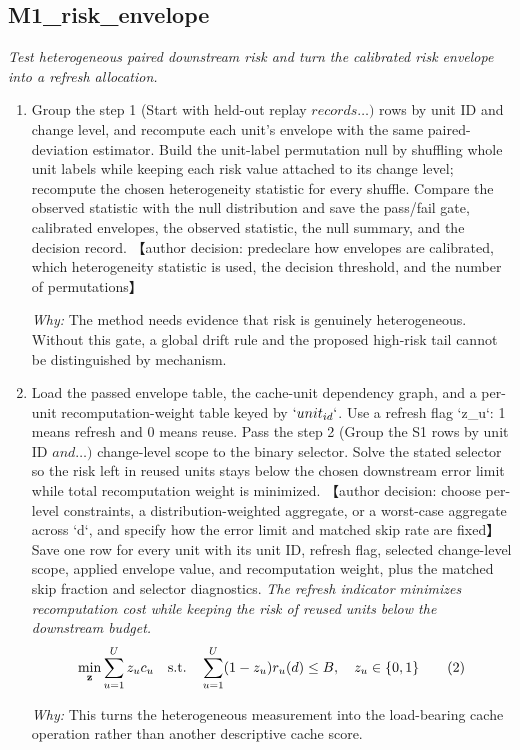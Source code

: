 \documentclass[10pt,a4paper]{article}
\begin{document}
\subsection*{M1\_risk\_envelope}
\emph{Test heterogeneous paired downstream risk and turn the calibrated risk envelope into a refresh allocation.}
\begin{enumerate}[leftmargin=*,start=2]
  \item Group the step 1 (Start with held-out replay \(records\dots )\) rows by unit ID and change level, and recompute each unit's envelope with the same paired-deviation estimator. Build the unit-label permutation null by shuffling whole unit labels while keeping each risk value attached to its change level;\allowbreak{} recompute the chosen heterogeneity statistic for every shuffle. Compare the observed statistic with the null distribution and save the pass/fail gate, calibrated envelopes, the observed statistic, the null summary, and the decision record. 【author decision: predeclare how envelopes are calibrated, which heterogeneity statistic is used, the decision threshold, and the number of permutations】
\par\emph{Why:} The method needs evidence that risk is genuinely heterogeneous. Without this gate, a global drift rule and the proposed high-risk tail cannot be distinguished by mechanism.
  \item Load the passed envelope table, the cache-unit dependency graph, and a per-unit recomputation-weight table keyed by \(`unit_{id}`\). Use a refresh flag `z\_u`: 1 means refresh and 0 means reuse. Pass the step 2 (Group the S1 rows by unit ID \(and\dots )\) change-level scope to the binary selector. Solve the stated selector so the risk left in reused units stays below the chosen downstream error limit while total recomputation weight is minimized. 【author decision: choose per-level constraints, a distribution-weighted aggregate, or a worst-case aggregate across `d`, and specify how the error limit and matched skip rate are fixed】 Save one row for every unit with its unit ID, refresh flag, selected change-level scope, applied envelope value, and recomputation weight, plus the matched skip fraction and selector diagnostics.
\noindent\emph{The refresh indicator minimizes recomputation cost while keeping the risk of reused units below the downstream budget.}
\begin{equation}
\resizebox{\ifdim\width>\linewidth \linewidth\else\width\fi}{!}{$\displaystyle \min_{\mathbf{z}}\sum_{u=1}^{U}z_uc_u\quad\text{s.t.}\quad\sum_{u=1}^{U}(1-z_u)r_u(d)\leq B,\quad z_u\in\{0,1\}$} \tag{2}
\end{equation}
\par\emph{Why:} This turns the heterogeneous measurement into the load-bearing cache operation rather than another descriptive cache score.
\end{enumerate}
\end{document}
